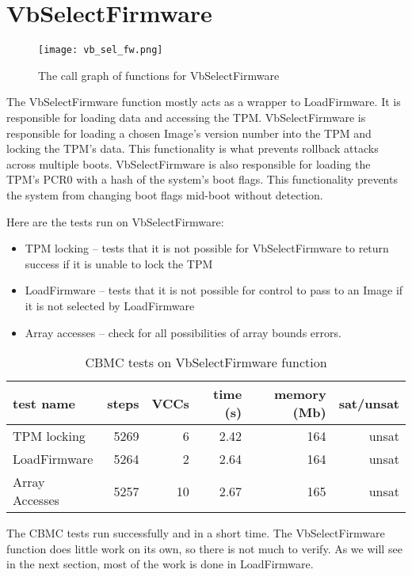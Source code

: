 \section{VbSelectFirmware}

\begin{figure}[!htbp]
  \centering
  \texttt{[image: vb\_sel\_fw.png]}
  \caption[VbSelectFirmware Call Graph]{The call graph of functions for VbSelectFirmware}\label{fig:vbselfw}
\end{figure}

The VbSelectFirmware function mostly acts as a wrapper to LoadFirmware.
It is responsible for loading data and accessing the TPM\@.
VbSelectFirmware is responsible for loading a chosen Image's version number into the TPM and locking the TPM's data. 
This functionality is what prevents rollback attacks across multiple boots.
VbSelectFirmware is also responsible for loading the TPM's PCR0 with a hash of the system's boot flags.
This functionality prevents the system from changing boot flags mid-boot without detection.  

Here are the tests run on VbSelectFirmware:
\begin{itemize}
 \item  TPM locking -- tests that it is not possible for VbSelectFirmware to return success if it is unable to lock the TPM
 \item  LoadFirmware -- tests that it is not possible for control to pass to an Image if it is not selected by LoadFirmware
 \item  Array accesses -- check for all possibilities of array bounds errors.
\end{itemize}

\begin{table}[!htbp]
    \centering
    \caption{CBMC tests on VbSelectFirmware function}\label{sfw_results}
    \begin{tabular}{lrrrrr}
        \toprule
        test name & steps & VCCs & time (s) & memory (Mb) & sat/unsat  \\ \midrule
        TPM locking & 5269 & 6 & 2.42 & 164 & unsat \\
        LoadFirmware & 5264 & 2 & 2.64 & 164 & unsat \\
        Array Accesses & 5257 & 10 & 2.67 & 165 &  unsat \\\bottomrule
    \end{tabular}
\end{table}

The CBMC tests run successfully and in a short time.
The VbSelectFirmware function does little work on its own, so there is not much to verify.
As we will see in the next section, most of the work is done in LoadFirmware. 

